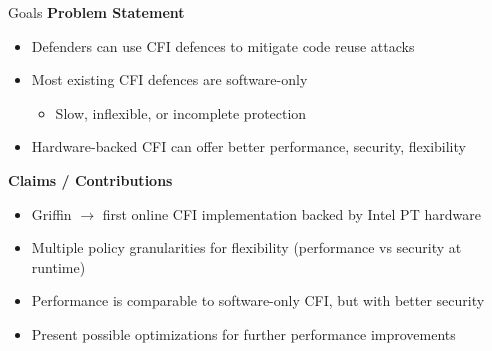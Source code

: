\documentclass[12pt, dvipsnames, aspectratio=169]{beamer}
\begin{document}
\begin{frame}[c]{Goals}{}
  {\bf Problem Statement}
  \begin{itemize}
    \item Defenders can use CFI defences to mitigate code reuse attacks
    \item Most existing CFI defences are software-only
    \begin{itemize}
      \item Slow, inflexible, or incomplete protection
    \end{itemize}
    \item Hardware-backed CFI can offer better performance, security, flexibility
  \end{itemize}

  \vfill
  {\bf Claims / Contributions}
  \begin{itemize}
    \item Griffin $\rightarrow$ first online CFI implementation backed by Intel PT hardware
    \item Multiple policy granularities for flexibility (performance vs security at runtime)
    \item Performance is comparable to software-only CFI, but with better security
    \item Present possible optimizations for further performance improvements
  \end{itemize}
\end{frame}
\end{document}
